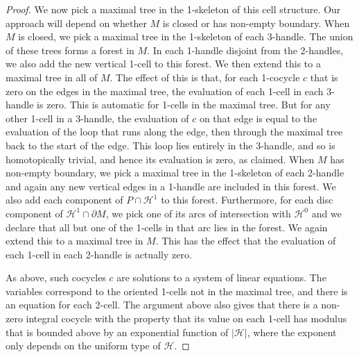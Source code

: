 \documentclass[oneside]{amsart}
\numberwithin{equation}{section}
\theoremstyle{plain}
\theoremstyle{definition}
\newcommand{\calH}{\mathcal{H}}
\begin{document}
\begin{proof}
We now pick a maximal tree in the 1-skeleton of this cell structure. Our approach will depend on whether $M$ is closed or has non-empty boundary. When $M$ is closed, we pick a maximal tree in the 1-skeleton of each 3-handle. The union of these trees forms a forest in $M$. In each 1-handle disjoint from the 2-handles, we also add the new vertical 1-cell to this forest. We then extend this to a maximal tree in all of $M$. The effect of this is that, for each 1-cocycle $c$ that is zero on the edges in the maximal tree, the evaluation of each 1-cell in each 3-handle is zero. This is automatic for 1-cells in the maximal tree. But for any other 1-cell in a 3-handle, the evaluation of $c$ on that edge is equal to the evaluation of the loop that runs along the edge, then through the maximal tree back to the start of the edge. This loop lies entirely in the 3-handle, and so is homotopically trivial, and hence its evaluation is zero, as claimed. When $M$ has non-empty boundary, we pick a maximal tree in the 1-skeleton of each 2-handle and again any new vertical edges in a 1-handle are included in this forest. We also add each component of $P \cap \calH^1$ to this forest. Furthermore, for each disc component of $\calH^1 \cap \partial M$, we pick one of its arcs of intersection with $\calH^0$ and we declare that all but one of the 1-cells in that arc lies in the forest.
We again extend this to a maximal tree in $M$. This has the effect that the evaluation of each 1-cell in each 2-handle is actually zero.

As above, such cocycles $c$ are solutions to a system of linear equations. The variables correspond to the oriented 1-cells not in the maximal tree, and there is an equation for each 2-cell. The argument above also gives that there is a non-zero integral cocycle with the property that its value on each 1-cell has modulus that is bounded above by an exponential function of $|\calH|$, where the exponent only depends on the uniform type of $\calH$.


\end{proof}
\end{document}
